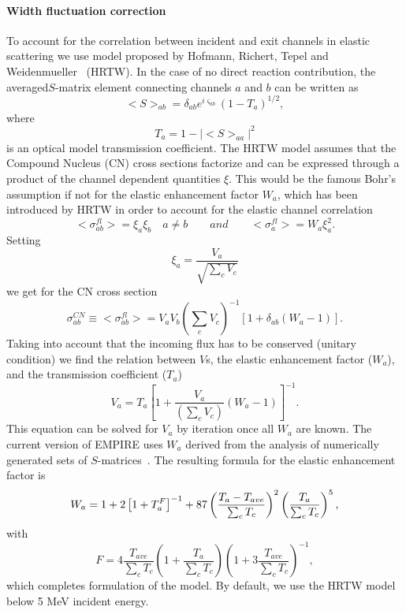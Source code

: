 \paragraph{Width fluctuation correction}

To account for the correlation between incident and exit channels in elastic
scattering we use model proposed by Hofmann, Richert, Tepel and
Weidenmueller~\cite{HRTW} (HRTW). In the case of no direct reaction
contribution, the averaged$S$-matrix element connecting channels $a$ and $b$
can be written as
\begin{equation}
<S>_{ab}=\delta_{ab}e^{i\varsigma_{ab}}(1-T_{a})^{1/2},  \label{Sab}
\end{equation}
\noindent where
\begin{equation}
T_{a}=1-|<S>_{aa}|^{2}  \label{Ta}
\end{equation}
is an optical model transmission coefficient. The HRTW model assumes that
the Compound Nucleus (CN) cross sections factorize and can be expressed
through a product of the channel dependent quantities $\xi$. This would be
the famous Bohr's assumption if not for the elastic enhancement factor $W_{a}
$, which has been introduced by HRTW in order to account for the elastic
channel correlation
\begin{equation}
<\sigma_{ab}^{fl}>=\xi_{a}\xi_{b}\quad a\neq b\qquad
and\qquad<\sigma_{a}^{fl}>=W_{a}\xi_{a}^{2}.  \label{Sig-fluc}
\end{equation}
Setting
\begin{equation}
\xi_{a}=%
\frac{V_{a}}{\sqrt{\sum_{c}V_{c}}}  \label{ksi}
\end{equation}
we get for the CN cross section
\begin{equation}
\sigma_{ab}^{CN}\equiv<\sigma_{ab}^{fl}>=V_{a}V_{b}\left(\sum_{c}V_{c}%
\right)^{-1}\left[1+\delta_{ab}\left(W_{a}-1\right)\right].
\label{Sig-flucV}
\end{equation}
Taking into account that the incoming flux has to be conserved (unitary
condition) we find the relation between $V$s, the elastic enhancement factor
($W_{a}$), and the transmission coefficient ($T_{a}$)
\begin{equation}
V_{a}=T_{a}\left[1+\frac{V_{a}}{\left(\sum_{c}V_{c}\right)}%
\left(W_{a}-1\right)\right]^{-1}.  \label{Va}
\end{equation}
This equation can be solved for $V_{a}$ by iteration once all $W_{a}$ are
known. The current version of EMPIRE uses $W_{a}$ derived from the analysis
of numerically generated sets of $S$-matrices~\cite{HHM}. The resulting
formula for the elastic enhancement factor is
\begin{equation}
W_{a}=1+2\left[1+T_{a}^{F}\right]^{-1}+87\left(\frac{T_{a}-T_{ave}}{%
\sum_{c}T_{c}}\right)^{2}\left(\frac{T_{a}}{\sum_{c}T_{c}}\right)^{5},
\label{Wa}
\end{equation}
with
\begin{equation}
F=4\frac{T_{ave}}{\sum_{c}T_{c}}\left(1+\frac{T_{a}}{\sum_{c}T_{c}}%
\right)\left(1+3\frac{T_{ave}}{\sum_{c}T_{c}}\right)^{-1},  \label{Wa-F}
\end{equation}
which completes formulation of the model. By default, we use the HRTW model
below 5 MeV incident energy.

